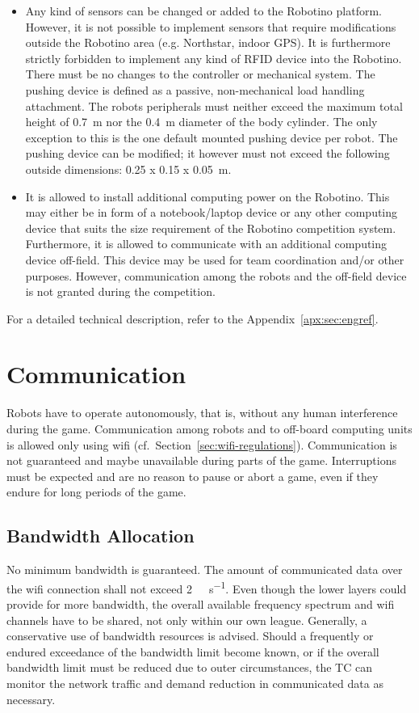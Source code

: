\documentclass[12pt,twoside]{article}
\newcommand{\Robotino}{Robotino}
\newcommand{\refsec}[1]{Section~\ref{#1}}
\begin{document}
\begin{itemize}
\item Any kind of sensors can be changed or added to the Robotino
  platform.  However, it is not possible to implement sensors that
  require modifications outside the Robotino area (e.g. Northstar,
  indoor GPS).  It is furthermore strictly forbidden to implement any
  kind of RFID device into the Robotino. There must be no changes to
  the controller or mechanical system. The pushing device is defined
  as a passive, non-mechanical load handling attachment. The robots
  peripherals must neither exceed the maximum total height of
  \SI{0.7}{\metre} nor the \SI{0.4}{\metre} diameter of the body
  cylinder. The only exception to this is the one default mounted
  pushing device per robot. The pushing device can be modified; it
  however must not exceed the following outside dimensions: \SI{0.25 x
    0.15 x 0.05}{\metre}.
\item It is allowed to install additional computing power on the
  \Robotino. This may either be in form of a notebook/laptop device or
  any other computing device that suits the size requirement of the
  \Robotino{} competition system. Furthermore, it is allowed to
  communicate with an additional computing device off-field. This
  device may be used for team coordination and/or other
  purposes. However, communication among the robots and the off-field
  device is not granted during the competition.
\end{itemize}

For a detailed technical description, refer to the
Appendix~\ref{apx:sec:engref}.

\section{Communication}
Robots have to operate autonomously, that is, without any human
interference during the game. Communication among robots and to
off-board computing units is allowed only using wifi
(cf.~\refsec{sec:wifi-regulations}). Communication is not guaranteed
and maybe unavailable during parts of the game. Interruptions must be
expected and are no reason to pause or abort a game, even if they
endure for long periods of the game.

\subsection{Bandwidth Allocation}
\label{sec:bandwidth}
No minimum bandwidth is guaranteed. The amount of communicated data
over the wifi connection shall not exceed
\SI{2}{\mega\bit\per\second}. Even though the lower layers could
provide for more bandwidth, the overall available frequency spectrum
and wifi channels have to be shared, not only within our own
league. Generally, a conservative use of bandwidth resources is
advised. Should a frequently or endured exceedance of the bandwidth
limit become known, or if the overall bandwidth limit must be reduced
due to outer circumstances, the TC can monitor the network traffic and
demand reduction in communicated data as necessary.
\end{document}
